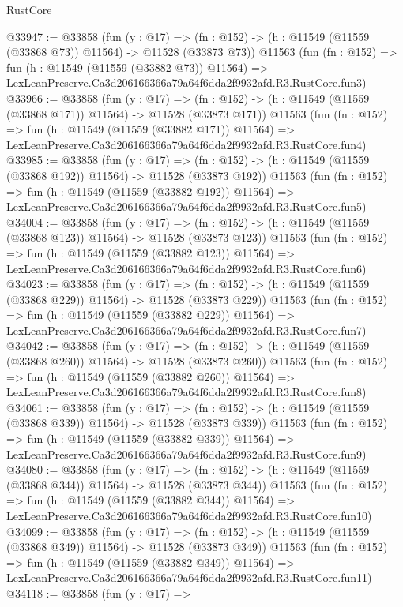 \begin{lexlean}{RustCore}
\begin{coremodule}
@33947 := @33858
    (fun (y : @17) =>
    (fn : @152) -> (h : @11549 (@11559 (@33868 @73)) @11564) -> @11528 (@33873 @73))
    @11563
    (fun (fn : @152) =>
    fun (h : @11549 (@11559 (@33882 @73)) @11564) =>
    LexLeanPreserve.Ca3d206166366a79a64f6dda2f9932afd.R3.RustCore.fun3)
@33966 := @33858
    (fun (y : @17) =>
    (fn : @152) -> (h : @11549 (@11559 (@33868 @171)) @11564) -> @11528 (@33873 @171))
    @11563
    (fun (fn : @152) =>
    fun (h : @11549 (@11559 (@33882 @171)) @11564) =>
    LexLeanPreserve.Ca3d206166366a79a64f6dda2f9932afd.R3.RustCore.fun4)
@33985 := @33858
    (fun (y : @17) =>
    (fn : @152) -> (h : @11549 (@11559 (@33868 @192)) @11564) -> @11528 (@33873 @192))
    @11563
    (fun (fn : @152) =>
    fun (h : @11549 (@11559 (@33882 @192)) @11564) =>
    LexLeanPreserve.Ca3d206166366a79a64f6dda2f9932afd.R3.RustCore.fun5)
@34004 := @33858
    (fun (y : @17) =>
    (fn : @152) -> (h : @11549 (@11559 (@33868 @123)) @11564) -> @11528 (@33873 @123))
    @11563
    (fun (fn : @152) =>
    fun (h : @11549 (@11559 (@33882 @123)) @11564) =>
    LexLeanPreserve.Ca3d206166366a79a64f6dda2f9932afd.R3.RustCore.fun6)
@34023 := @33858
    (fun (y : @17) =>
    (fn : @152) -> (h : @11549 (@11559 (@33868 @229)) @11564) -> @11528 (@33873 @229))
    @11563
    (fun (fn : @152) =>
    fun (h : @11549 (@11559 (@33882 @229)) @11564) =>
    LexLeanPreserve.Ca3d206166366a79a64f6dda2f9932afd.R3.RustCore.fun7)
@34042 := @33858
    (fun (y : @17) =>
    (fn : @152) -> (h : @11549 (@11559 (@33868 @260)) @11564) -> @11528 (@33873 @260))
    @11563
    (fun (fn : @152) =>
    fun (h : @11549 (@11559 (@33882 @260)) @11564) =>
    LexLeanPreserve.Ca3d206166366a79a64f6dda2f9932afd.R3.RustCore.fun8)
@34061 := @33858
    (fun (y : @17) =>
    (fn : @152) -> (h : @11549 (@11559 (@33868 @339)) @11564) -> @11528 (@33873 @339))
    @11563
    (fun (fn : @152) =>
    fun (h : @11549 (@11559 (@33882 @339)) @11564) =>
    LexLeanPreserve.Ca3d206166366a79a64f6dda2f9932afd.R3.RustCore.fun9)
@34080 := @33858
    (fun (y : @17) =>
    (fn : @152) -> (h : @11549 (@11559 (@33868 @344)) @11564) -> @11528 (@33873 @344))
    @11563
    (fun (fn : @152) =>
    fun (h : @11549 (@11559 (@33882 @344)) @11564) =>
    LexLeanPreserve.Ca3d206166366a79a64f6dda2f9932afd.R3.RustCore.fun10)
@34099 := @33858
    (fun (y : @17) =>
    (fn : @152) -> (h : @11549 (@11559 (@33868 @349)) @11564) -> @11528 (@33873 @349))
    @11563
    (fun (fn : @152) =>
    fun (h : @11549 (@11559 (@33882 @349)) @11564) =>
    LexLeanPreserve.Ca3d206166366a79a64f6dda2f9932afd.R3.RustCore.fun11)
@34118 := @33858
    (fun (y : @17) =>

\end{coremodule}
\end{lexlean}
